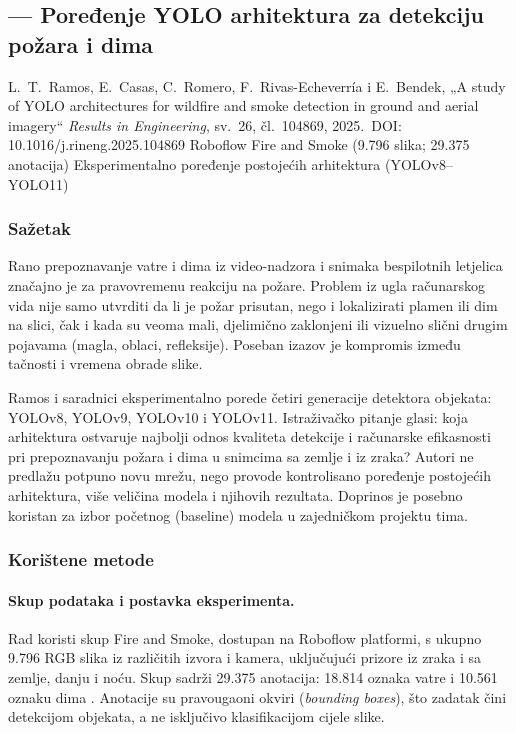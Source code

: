 \clearpage
\subsection{\texorpdfstring{\AutorD}{Dino Burić} --- Poređenje YOLO arhitektura za detekciju požara i dima}

  {L.\ T.\ Ramos, E.\ Casas, C.\ Romero, F.\ Rivas-Echeverría i E.\ Bendek, „A study of YOLO architectures for wildfire and smoke detection in ground and aerial imagery“ \cite{ramos}}
  {\emph{Results in Engineering}, sv.\ 26, čl.\ 104869, 2025.\ DOI: 10.1016/j.rineng.2025.104869}
  {Roboflow Fire and Smoke (9.796 slika; 29.375 anotacija)}
  {Eksperimentalno poređenje postojećih arhitektura (YOLOv8--YOLO11)}

\subsubsection{Sažetak}
Rano prepoznavanje vatre i dima iz video-nadzora i snimaka bespilotnih letjelica značajno je za pravovremenu reakciju na požare. Problem iz ugla računarskog vida nije samo utvrditi da li je požar prisutan, nego i lokalizirati plamen ili dim na slici, čak i kada su veoma mali, djelimično zaklonjeni ili vizuelno slični drugim pojavama (magla, oblaci, refleksije). Poseban izazov je kompromis između tačnosti i vremena obrade slike.

Ramos i saradnici \cite{ramos} eksperimentalno porede četiri generacije detektora objekata: YOLOv8, YOLOv9, YOLOv10 i YOLOv11. Istraživačko pitanje glasi: koja arhitektura ostvaruje najbolji odnos kvaliteta detekcije i računarske efikasnosti pri prepoznavanju požara i dima u snimcima sa zemlje i iz zraka? Autori ne predlažu potpuno novu mrežu, nego provode kontrolisano poređenje postojećih arhitektura, više veličina modela i njihovih rezultata. Doprinos je posebno koristan za izbor početnog (baseline) modela u zajedničkom projektu tima.

\subsubsection{Korištene metode}
\paragraph{Skup podataka i postavka eksperimenta.} Rad koristi skup Fire and Smoke, dostupan na Roboflow platformi, s ukupno 9.796 RGB slika iz različitih izvora i kamera, uključujući prizore iz zraka i sa zemlje, danju i noću. Skup sadrži 29.375 anotacija: 18.814 oznaka vatre i 10.561 oznaku dima \cite{ramos}. Anotacije su pravougaoni okviri (\emph{bounding boxes}), što zadatak čini detekcijom objekata, a ne isključivo klasifikacijom cijele slike.

